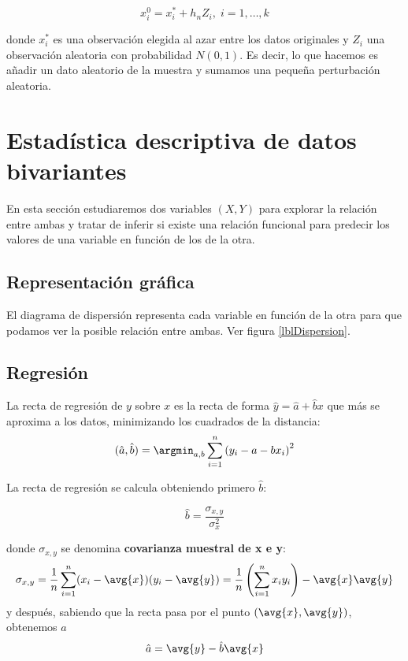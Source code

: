 \documentclass{apuntes}
\begin{document}
\[ x_i^0 = x_i^* + h_n Z_i,\; i=1,\dotsc, k \]

donde $x_i^*$ es una observación elegida al azar entre los datos originales y $Z_i$ una observación aleatoria con probabilidad $N(0,1)$. Es decir, lo que hacemos es añadir un dato aleatorio de la muestra y sumamos una pequeña perturbación aleatoria.

\section{Estadística descriptiva de datos bivariantes}

En esta sección estudiaremos dos variables $(X, Y)$ para explorar la relación entre ambas y tratar de inferir si existe una relación funcional para predecir los valores de una variable en función de los de la otra.

\subsection{Representación gráfica}

\begin{defn}
El diagrama de dispersión representa cada variable en función de la otra para que podamos ver la posible relación entre ambas. Ver figura \ref{lblDispersion}.

\end{defn}

\newpage
\subsection{Regresión}

\begin{defn}

La recta de regresión de $y$ sobre $x$ es la recta de forma $\hat{y} = \hat{a} + \hat{b}x$ que más se aproxima a los datos, minimizando los cuadrados de la distancia: \[ (\hat{a},\hat{b}) =\argmin_{a, b} \sum_{i=1}^n\left(y_i - a - bx_i\right)^2 \]
\end{defn}

La recta de regresión se calcula obteniendo primero $\hat{b}$:

\[ \hat{b} = \frac{\sigma_{x,y}}{\sigma^2_x} \]

donde $\sigma_{x,y}$ se denomina \textbf{covarianza muestral de x e y}:
\[ \sigma_{x,y} = \frac{1}{n} \sum_{i=1}^n (x_i - \avg{x})(y_i - \avg{y}) = \frac{1}{n} \left( \sum_{i=1}^n x_i y_i \right)  - \avg{x}\avg{y} \]
y después, sabiendo que la recta pasa por el punto $(\avg{x}, \avg{y})$, obtenemos $\hat{a}$ \[ \hat{a} = \avg{y} - \hat{b}\avg{x} \]
\end{document}
